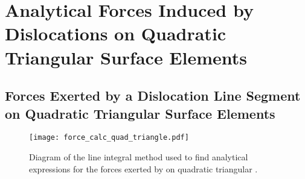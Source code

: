 \chapter{Analytical Forces Induced by Dislocations on Quadratic Triangular Surface Elements}
\label{c:quad_triang}
	\section{Forces Exerted by a Dislocation Line Segment on Quadratic Triangular Surface Elements}
	\label{s:f_quad_triang}
	\begin{figure}
		\centering
		\texttt{[image: force\_calc\_quad\_triangle.pdf]}
		\caption[Diagram of the analytical force calculation on quadratic triangular surface elements.]{Diagram of the line integral method used to find analytical expressions for the forces exerted by  on quadratic triangular .}
		\label{f:fqts}
	\end{figure}
\savearabiccounter
